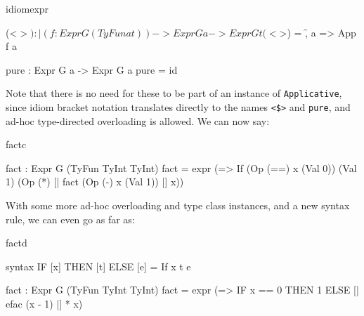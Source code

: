 \begin{SaveVerbatim}{idiomexpr}

(<$>) : |(f : Expr G (TyFun a t)) -> Expr G a -> Expr G t
(<$>) = \f, a => App f a

pure : Expr G a -> Expr G a
pure = id

\end{SaveVerbatim}

\noindent
Note that there is no need for these to be part of an instance of \texttt{Applicative},
since idiom bracket notation translates directly to the names \texttt{<\$>} and
\texttt{pure}, and ad-hoc type-directed overloading is allowed. We can now say:

\begin{SaveVerbatim}{factc}

fact : Expr G (TyFun TyInt TyInt)
fact = expr (\x => If (Op (==) x (Val 0))
                      (Val 1) (Op (*) [| fact (Op (-) x (Val 1)) |] x))

\end{SaveVerbatim}

\noindent
With some more ad-hoc overloading and type class instances, and a new
syntax rule, we can even go as far as:

\begin{SaveVerbatim}{factd}

syntax IF [x] THEN [t] ELSE [e] = If x t e

fact : Expr G (TyFun TyInt TyInt)
fact = expr (\x => IF x == 0 THEN 1 ELSE [| efac (x - 1) |] * x)

\end{SaveVerbatim}

